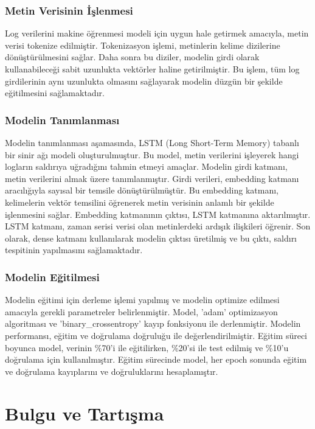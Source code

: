 \documentclass[12pt,a4paper]{article}
\begin{document}
\subsubsection{Metin Verisinin İşlenmesi}

Log verilerini makine öğrenmesi modeli için uygun hale getirmek amacıyla, metin verisi tokenize edilmiştir. Tokenizasyon işlemi, metinlerin kelime dizilerine dönüştürülmesini sağlar. Daha sonra bu diziler, modelin girdi olarak kullanabileceği sabit uzunlukta vektörler haline getirilmiştir. Bu işlem, tüm log girdilerinin aynı uzunlukta olmasını sağlayarak modelin düzgün bir şekilde eğitilmesini sağlamaktadır.

\subsubsection{Modelin Tanımlanması}

Modelin tanımlanması aşamasında, LSTM (Long Short-Term Memory) tabanlı bir sinir ağı modeli oluşturulmuştur. Bu model, metin verilerini işleyerek hangi logların saldırıya uğradığını tahmin etmeyi amaçlar. Modelin girdi katmanı, metin verilerini almak üzere tanımlanmıştır. Girdi verileri, embedding katmanı aracılığıyla sayısal bir temsile dönüştürülmüştür. Bu embedding katmanı, kelimelerin vektör temsilini öğrenerek metin verisinin anlamlı bir şekilde işlenmesini sağlar. Embedding katmanının çıktısı, LSTM katmanına aktarılmıştır. LSTM katmanı, zaman serisi verisi olan metinlerdeki ardışık ilişkileri öğrenir. Son olarak, dense katmanı kullanılarak modelin çıktısı üretilmiş ve bu çıktı, saldırı tespitinin yapılmasını sağlamaktadır.

\subsubsection{Modelin Eğitilmesi}

Modelin eğitimi için derleme işlemi yapılmış ve modelin optimize edilmesi amacıyla gerekli parametreler belirlenmiştir. Model, 'adam' optimizasyon algoritması ve 'binary\_crossentropy' kayıp fonksiyonu ile derlenmiştir. Modelin performansı, eğitim ve doğrulama doğruluğu ile değerlendirilmiştir. Eğitim süreci boyunca model, verinin \%70'i ile eğitilirken, \%20'si ile test edilmiş ve \%10'u doğrulama için kullanılmıştır. Eğitim sürecinde model, her epoch sonunda eğitim ve doğrulama kayıplarını ve doğruluklarını hesaplamıştır.

\section{Bulgu ve Tartışma}
\end{document}
